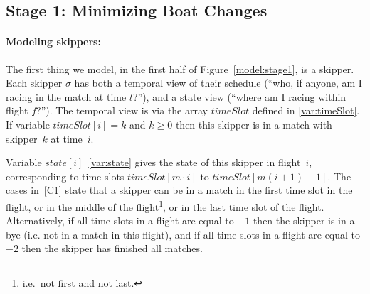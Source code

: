 \documentclass{llncs}
\newcommand{\timeSlot}{\mathit{timeSlot}}
\newcommand{\state}{\mathit{state}}
\begin{document}
\subsection{Stage 1: Minimizing Boat Changes}
\paragraph{Modeling skippers:} The first thing we model, in the first half of
Figure~\ref{model:stage1}, is a skipper. Each skipper $\sigma$ has both a temporal view of their
schedule (``who, if anyone, am I racing in the match at time $t$?''), and a state view (``where am
I racing within flight $f$?'').  The temporal view is via the array $\timeSlot$ defined in
\eqref{var:timeSlot}. If variable $\timeSlot[{i}] = k$ and $k \geq 0$ then this skipper is in a
match with skipper~$k$ at time~$i$.

Variable $\state[{i}]$~\eqref{var:state} gives the state of this skipper in flight~$i$,
corresponding to time slots $\timeSlot[{m \cdot i}]$ to $\timeSlot[{m(i+1)-1}]$.
The cases in~\eqref{C1} state that a skipper can be in a match in the first time slot in the flight,
or in the middle of the flight\footnote{i.e.\ not first and not last.}, or in the last time slot of
the flight. Alternatively, if all time slots in a flight are equal to $-1$ then the skipper is in a
bye (i.e. not in a match in this flight), and if all time slots in a flight are equal to $-2$ then
the skipper has finished all matches.
\end{document}
